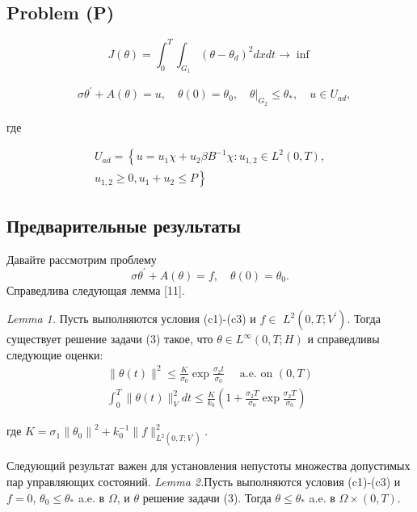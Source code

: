 \subsection{Problem (P)}
\label{subsec:ch3:sec2:subsec3}
\[
    J(\theta)=\int_{0}^{T}
    \int_{G_{1}}\left(\theta-\theta_{d}\right)^{2} d x d t \rightarrow \inf
\]

\[
    \begin{aligned}
        & \sigma \theta^{\prime}+A(\theta)=u,
        \quad \theta(0)=\theta_{0},\left.\quad
        \theta\right|_{G_{2}} \leq \theta_{*},
        \quad u \in U_{a d},
    \end{aligned}
\]

где

\[
    \begin{array}{r}
        U_{a d}=\left\{u=u_{1} \chi+u_{2} \beta B^{-1}
        \chi: u_{1,2} \in L^{2}(0, T),\right. \\
        \left.u_{1,2} \geq 0, u_{1}+u_{2} \leq P\right\}
    \end{array}
\]

\subsection{Предварительные результаты}
\label{subsec:ch3:sec2:subsec4}
Давайте рассмотрим проблему
\[
    \sigma \theta^{\prime}+A(\theta)=f, \quad \theta(0)=\theta_{0}.
\]
Справедлива следующая лемма [11].

\textit{Lemma 1.}
Пусть выполняются условия (c1)-(c3) и $f \in$ $L^{2}\left(0, T ; V^{\prime}\right)$.
Тогда существует решение задачи (3) такое, что $\theta \in L^{\infty}(0, T ; H)$
и справедливы следующие оценки:
\[
    \begin{gathered}
        \|\theta(t)\|^{2} \leq \frac{K}{\sigma_{0}} \exp \frac{\sigma_{2} t}{\sigma_{0}}
        \quad \text { a.e. on }(0, T) \\
        \int_{0}^{T}\|\theta(t)\|_{V}^{2} d t \leq
        \frac{K}{k_{0}}\left(1+\frac{\sigma_{2} T}{\sigma_{0}} \exp
        \frac{\sigma_{2} T}{\sigma_{0}}\right)
    \end{gathered}
\]

где $K=\sigma_{1}\left\|\theta_{0}\right\|^{2}
+ k_{0}^{-1}\|f\|_{L^{2}\left(0, T; V^{\prime}\right)}^{2}$.

Следующий результат важен для установления непустоты множества допустимых пар управляющих состояний.
\textit{Lemma 2.}Пусть выполняются условия (c1)-(c3) и
$f=0$, $\theta_{0} \leq \theta_{*}$ a.e. в $\Omega$, и $\theta$ решение задачи (3).
Тогда $\theta \leq \theta_{*}$ a.e. в $\Omega \times(0, T)$.

